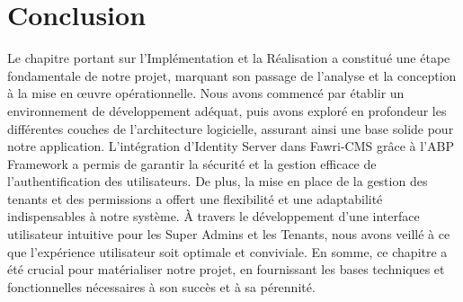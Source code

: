 


















\newpage

\section*{Conclusion}

\hspace{\parindent}Le chapitre portant sur l'Implémentation et la Réalisation a constitué une étape fondamentale de notre projet, marquant son passage de l’analyse et la conception à la mise en œuvre opérationnelle. Nous avons commencé par établir un environnement de développement adéquat, puis avons exploré en profondeur les différentes couches de l'architecture logicielle, assurant ainsi une base solide pour notre application. L'intégration d'Identity Server dans Fawri-CMS grâce à l'ABP Framework a permis de garantir la sécurité et la gestion efficace de l'authentification des utilisateurs. De plus, la mise en place de la gestion des tenants et des permissions a offert une flexibilité et une adaptabilité indispensables à notre système. À travers le développement d'une interface utilisateur intuitive pour les Super Admins et les Tenants, nous avons veillé à ce que l'expérience utilisateur soit optimale et conviviale. En somme, ce chapitre a été crucial pour matérialiser notre projet, en fournissant les bases techniques et fonctionnelles nécessaires à son succès et à sa pérennité.

\pagebreak